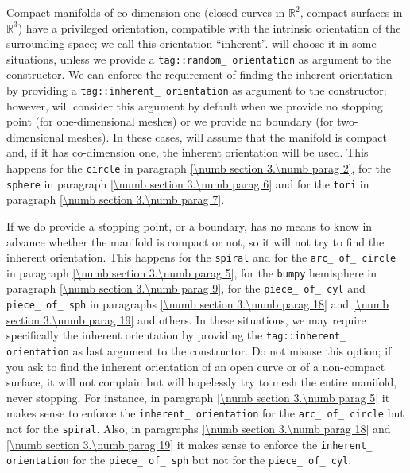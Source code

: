 Compact manifolds of co-dimension one (closed curves in $ \mathbb{R}^2 $,
compact surfaces in $ \mathbb{R}^3 $) have a privileged orientation,
compatible with the intrinsic orientation of the surrounding space;
we call this orientation ``inherent''.
{\ManiFEM} will choose it in some situations, unless we provide a
{\small\tt \textcolor{tag}{tag}::random\_\,orientation} as argument to the {\small\tt {}} constructor.
We can enforce the requirement of finding the inherent orientation by providing a
{\small\tt \textcolor{tag}{tag}::inherent\_\,orientation} as argument to the {\small\tt {}} constructor;
however, {\maniFEM} will consider this argument by default when we provide no stopping
point (for one-dimensional meshes) or we provide no boundary (for two-dimensional meshes).
In these cases, {\maniFEM} will assume that the manifold is compact and, if it has
co-dimension one, the inherent orientation will be used.
This happens for the {\small\tt circle} in paragraph \ref{\numb section 3.\numb parag 2},
for the {\small\tt sphere} in paragraph \ref{\numb section 3.\numb parag 6} and for the
{\small\tt tori} in paragraph \ref{\numb section 3.\numb parag 7}.

If we do provide a stopping point, or a boundary, {\maniFEM} has no means to know in
advance whether the manifold
is compact or not, so it will not try to find the inherent orientation.
This happens for the {\small\tt spiral} and for the {\small\tt arc\_\,of\_\,circle} in paragraph
\ref{\numb section 3.\numb parag 5}, for the {\small\tt bumpy} hemisphere in paragraph
\ref{\numb section 3.\numb parag 9}, for the {\small\tt piece\_\,of\_\,cyl} and
{\small\tt piece\_\,of\_\,sph} in paragraphs \ref{\numb section 3.\numb parag 18} and
\ref{\numb section 3.\numb parag 19} and others.
In these situations, we may require specifically the inherent orientation
by providing the {\small\tt \textcolor{tag}{tag}::inherent\_\,orientation} as last argument to the
{\small\tt {}} constructor.
Do not misuse this option; if you ask {\maniFEM} to find the inherent orientation of an open
curve or of a non-compact surface, it will not complain but will hopelessly try to mesh
the entire manifold, never stopping.
For instance, in paragraph \ref{\numb section 3.\numb parag 5} it makes sense to enforce the
{\small\tt inherent\_\,orientation} for the {\small\tt arc\_\,of\_\,circle} but not for the
{\small\tt spiral}.
Also, in paragraphs \ref{\numb section 3.\numb parag 18} and
\ref{\numb section 3.\numb parag 19} it makes sense to enforce the
{\small\tt inherent\_\,orientation} for the
{\small\tt piece\_\,of\_\,sph} but not for the {\small\tt piece\_\,of\_\,cyl}.

